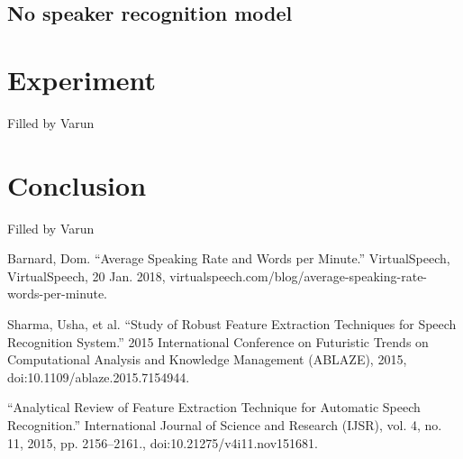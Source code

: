 \documentclass[10pt,twocolumn,letterpaper]{article}
\begin{document}
\subsection{No speaker recognition model} 


\section{Experiment}

Filled by Varun


\section{Conclusion}

Filled by Varun



\begin{thebibliography}{1}

      Barnard, Dom. “Average Speaking Rate and Words per Minute.” VirtualSpeech, VirtualSpeech, 20 Jan. 2018, virtualspeech.com/blog/average-speaking-rate-words-per-minute. 
  
      Sharma, Usha, et al. “Study of Robust Feature Extraction Techniques for Speech Recognition System.” 2015 International Conference on Futuristic Trends on Computational Analysis and Knowledge Management (ABLAZE), 2015, doi:10.1109/ablaze.2015.7154944. 
  
    “Analytical Review of Feature Extraction Technique for Automatic Speech Recognition.” International Journal of Science and Research (IJSR), vol. 4, no. 11, 2015, pp. 2156–2161., doi:10.21275/v4i11.nov151681. 
  
  
\end{thebibliography}
\end{document}

